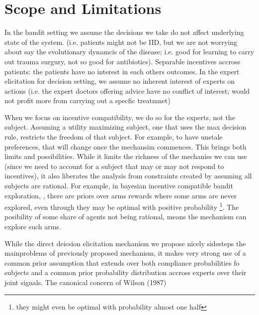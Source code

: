 \section{Scope and Limitations}

In the bandit setting we assume the decisions we take do not affect underlying state of the system. (i.e. patients might not be IID, but we are not worrying about say the evolutionary dynamcis of the disease; i.e. good for learning to carry out trauma surgury, not so good for antibiotics).  Separable incentives accross patients: the patients have no interest in each others outcomes. 
In the expert elicitation for decision setting, we assume no inherent interest of experts on actions (i.e. the expert doctors offering advice have no conflict of interest; would not profit more from carrying out a specfic treatmnet) 

When we focus on incentive compatibility, we do so for the experts, not the subject. Assuming a  utility maximizing subject, one that uses the max decision rule, restricts the freedom of that subject. For example, to have unstale preferences, that will change once the mechansim commences. This brings both limits and possibilities. While it limits the richness of the mechaniss we can use (since we need to account for a subject that may or may not respond to incentives), it also liberates the analysis from constraints created by assuming all subjects are rational. For example, in bayesian incentive compatible bandit exploration, \cite{mansour2015bayesian}, there are priors over arms rewards where some arms are never explored, even through they may be optimal with positive probability \footnote{they might even be optimal with probability almost one half}. The posibility of some share of agents not being rational, means the mechanism can explore such arms.

While the direct deicsion elicitation mechanism we propose nicely sidesteps the mainproblems of previously proposed mechanism, it makes very strong use of a common prior assumption that extends over both compliance probabilities fo subjects and a common prior probability distribution accross experts over their joint signals. The canonical concern of Wilson (1987) 


